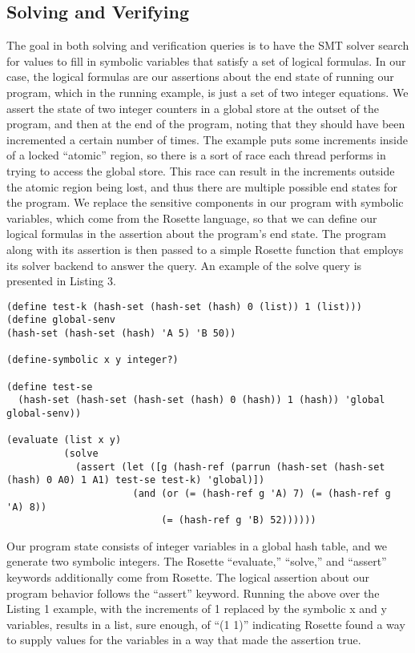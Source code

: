 \subsection{Solving and Verifying}
The goal in both solving and verification queries is to have the SMT solver search for values to fill in symbolic variables that satisfy a set of logical formulas.  In our case, the logical formulas are our assertions about the end state of running our program, which in the running example, is just a set of two integer equations.  We assert the state of two integer counters in a global store at the outset of the program, and then at the end of the program, noting that they should have been incremented a certain number of times.  The example puts some increments inside of a locked ``atomic'' region, so there is a sort of race each thread performs in trying to access the global store.  This race can result in the increments outside the atomic region being lost, and thus there are multiple possible end states for the program.  We replace the sensitive components in our program with symbolic variables, which come from the Rosette language, so that we can define our logical formulas in the assertion about the program's end state.  The program along with its assertion is then passed to a simple Rosette function that employs its solver backend to answer the query.  An example of the solve query is presented in Listing 3.

\begin{lstlisting}[caption={Setup and Test Environment.},captionpos=b,frame=single]
(define test-k (hash-set (hash-set (hash) 0 (list)) 1 (list)))
(define global-senv
(hash-set (hash-set (hash) 'A 5) 'B 50))

(define-symbolic x y integer?)

(define test-se
  (hash-set (hash-set (hash-set (hash) 0 (hash)) 1 (hash)) 'global global-senv))

(evaluate (list x y)
          (solve
            (assert (let ([g (hash-ref (parrun (hash-set (hash-set (hash) 0 A0) 1 A1) test-se test-k) 'global)])
                      (and (or (= (hash-ref g 'A) 7) (= (hash-ref g 'A) 8))
                           (= (hash-ref g 'B) 52))))))
\end{lstlisting}

Our program state consists of integer variables in a global hash table, and we generate two symbolic integers.  The Rosette ``evaluate,'' ``solve,'' and ``assert'' keywords additionally come from Rosette.  The logical assertion about our program behavior follows the ``assert'' keyword.  Running the above over the Listing 1 example, with the increments of 1 replaced by the symbolic x and y variables, results in a list, sure enough, of ``(1 1)'' indicating Rosette found a way to supply values for the variables in a way that made the assertion true.

